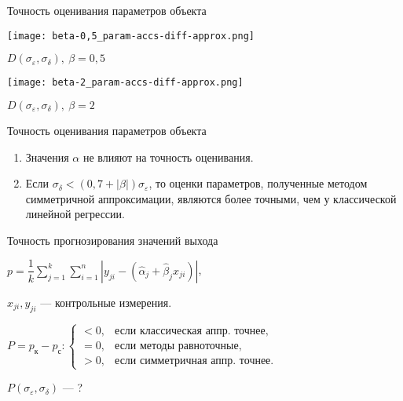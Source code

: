 \documentclass[hyperref={pdftex,unicode}]{beamer}
\begin{document}
\begin{frame}{Точность оценивания параметров объекта}
  \begin{minipage}[h]{0.49\linewidth}\centering
    \texttt{[image: beta-0,5\_param-accs-diff-approx.png]}

    \bigskip
    \scriptsize\( D(\sigma_{\varepsilon}, \sigma_{\delta}), \: \beta = 0{,}5 \)
  \end{minipage}
  \hfill
  \begin{minipage}[h]{0.49\linewidth}\centering
    \texttt{[image: beta-2\_param-accs-diff-approx.png]}

    \bigskip
    \scriptsize\( D(\sigma_{\varepsilon}, \sigma_{\delta}), \: \beta = 2 \)
  \end{minipage}
\end{frame}

\begin{frame}{Точность оценивания параметров объекта}
  \begin{enumerate}
  \item Значения \( \alpha \) не влияют на точность оценивания.
  \item Если \( \sigma_{\delta} < (0,7 + |\beta|)\sigma_{\varepsilon} \),
    то оценки параметров, полученные методом симметричной аппроксимации,
    являются более точными, чем у классической \\
    линейной регрессии.
  \end{enumerate}
\end{frame}

\begin{frame}{Точность прогнозирования значений выхода}
  \begin{center}\large
    \( p = \dfrac{1}{k} \sum_{j=1}^k \sum_{i=1}^n |y_{ji} - (\hat{\alpha}_{j} + \hat{\beta}_{j} x_{ji})| \),

    \bigskip
    \( x_{ji}, y_{ji} \) --- контрольные измерения.

    \bigskip
    \( P = p_{\text{к}} - p_{\text{с}}:
    \begin{cases}
      < 0, & \text{если классическая аппр. точнее}, \\
      = 0, & \text{если методы равноточные}, \\
      > 0, & \text{если симметричная аппр. точнее}.
    \end{cases} \)

    \bigskip
    \( P(\sigma_{\varepsilon}, \sigma_{\delta}) \) --- ?
  \end{center}
\end{frame}
\end{document}
